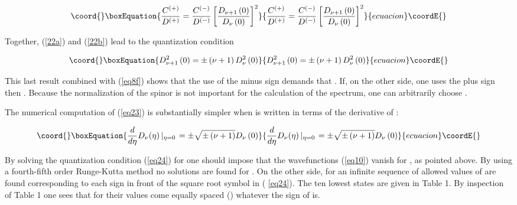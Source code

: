 \documentclass[a4paper,12pt,titlepage]{article}
\begin{document}
\begin{equation}\coord{}\boxEquation{
\frac{C^{\left( +\right) }}{D^{\left( +\right) }}=\frac{C^{\left( -\right) }
}{D^{\left( -\right) }}\left[ \frac{D_{\nu +1}\left( 0\right) }{D_{\nu
}\left( 0\right) }\right] ^{2}  \label{22b}
}{
\frac{C^{\left( +\right) }}{D^{\left( +\right) }}=\frac{C^{\left( -\right) }
}{D^{\left( -\right) }}\left[ \frac{D_{\nu +1}\left( 0\right) }{D_{\nu
}\left( 0\right) }\right] ^{2}  }{ecuacion}\coordE{}\end{equation}

\noindent Together, (\ref{22a}) and (\ref{22b}) lead to the quantization
condition

\begin{equation}\coord{}\boxEquation{
D_{\nu +1}^{2}\left( 0\right) =\pm \left( \nu +1\right) D_{\nu }^{2}\left(
0\right)  \label{eq23}
}{
D_{\nu +1}^{2}\left( 0\right) =\pm \left( \nu +1\right) D_{\nu }^{2}\left(
0\right)  }{ecuacion}\coordE{}\end{equation}

\noindent This last result combined with (\ref{eq8f}) \noindent shows that
the use of the minus sign demands that \coordHE{}. If, on the other side, one uses the plus sign then \coordHE{}. Because the normalization of the spinor is not important
for the calculation of the spectrum, one can arbitrarily choose \coordHE{}.

The numerical computation of (\ref{eq23}) is substantially simpler when \coordHE{} is written in terms of the derivative of \coordHE{}:

\begin{equation}\coord{}\boxEquation{
\frac{d}{d\eta }D_{\nu }(\eta )\left| _{\eta =0}\right. =\pm \sqrt{\pm
\left( \nu +1\right) }D_{\nu }\left( 0\right)  \label{eq24}
}{
\frac{d}{d\eta }D_{\nu }(\eta )\left| _{\eta =0}\right. =\pm \sqrt{\pm
\left( \nu +1\right) }D_{\nu }\left( 0\right)  }{ecuacion}\coordE{}\end{equation}

\noindent By solving the quantization condition (\ref{eq24}) for \myHighlight{$\nu $}\coordHE{} one
should impose that the wavefunctions (\ref{eq10}) vanish for \myHighlight{$|\eta
|\rightarrow \infty $}\coordHE{}, as pointed above. By using a fourth-fifth order
Runge-Kutta method \cite{fm} no solutions are found for \coordHE{}. On the
other side, for \coordHE{} an infinite sequence of allowed values of \myHighlight{$\nu $}\coordHE{}
are found corresponding to each sign in front of the square root symbol in (%
\ref{eq24}). The ten lowest states are given in Table 1. By inspection of
Table 1 one sees that for \myHighlight{$\nu \rightarrow \infty $}\coordHE{} their values come
equally spaced (\coordHE{}) whatever the sign of \myHighlight{$\nu $}\coordHE{} is.
\end{document}
